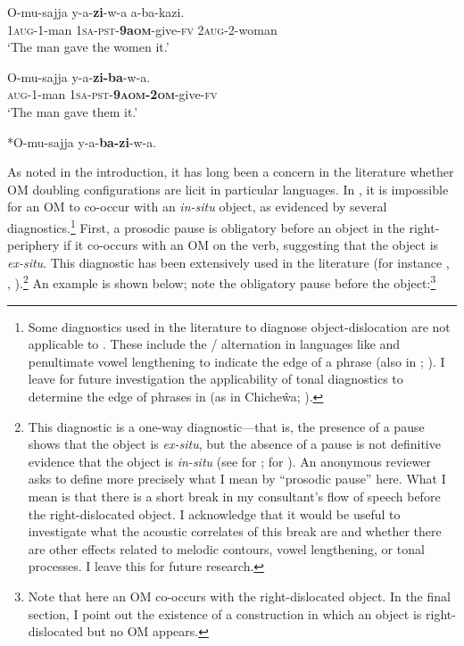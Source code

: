 \documentclass[output=paper,newtxmath,modfonts,nonflat,hidelinks]{langsci/langscibook}
\begin{document}
\ex\label{ex:ranero:9b}
\gll O-mu-sajja    y-a-\textbf{zi}{}-w-a            a-ba-kazi.\\
1\textsc{aug}{}-1-man 1\textsc{sa}{}-\textsc{pst}{}-\textbf{9a\textsc{om}}{}-give-\textsc{fv} 2\textsc{aug}{}-2-woman\\
\glt ‘The man gave the women it.’

\ex\label{ex:ranero:9c}
\gll O-mu-sajja  y-a-\textbf{zi-ba}{}-w-a. \\       
\textsc{aug-}1-man \textsc{1sa-pst}{}-\textbf{\textsc{9aom-2om}}{}-give-\textsc{fv}\\
\glt ‘The man gave them it.’

\ex\label{ex:ranero:9d}*O-mu-sajja y-a-\textbf{ba-zi}{}-w-a.
\z
\z

As noted in the introduction, it has long been a concern in the  literature whether OM doubling configurations are licit in particular languages. In , it is impossible for an OM to co-occur with an \textit{in-situ} object, as evidenced by several diagnostics.\footnote{Some diagnostics used in the  literature to diagnose object-dislocation are not applicable to . These include the / alternation in languages like  \citep{Zeller2015} and penultimate vowel lengthening to indicate the edge of a phrase (also in ; \citealt{ChengDowning2009}). I leave for future investigation the applicability of tonal diagnostics to determine the edge of phrases in  (as in Chiche\^wa; \citealt{Bresnan1987}).} First, a prosodic pause is obligatory before an object in the right-periphery if it co-occurs with an OM on the verb, suggesting that the object is \textit{ex-situ}. This diagnostic has been extensively used in the  literature (for instance \citealt{Cecchetto1999}, \citealt{Cruschina2011}, \citealt{anagnostopouloutoappear}).\footnote{This diagnostic is a one-way diagnostic—that is, the presence of a pause shows that the object is \textit{ex-situ}, but the absence of a pause is not definitive evidence that the object is \textit{in-situ} (see \citealt{dierckstoappear} for ; \citealt{diercks2015} for ). An anonymous reviewer asks to define more precisely what I mean by “prosodic pause” here. What I mean is that there is a short break in my consultant’s flow of speech before the right-dislocated object. I acknowledge that it would be useful to investigate what the acoustic correlates of this break are and whether there are other effects related to melodic contours, vowel lengthening, or tonal processes. I leave this for future research.} An example is shown below; note the obligatory pause before the object:\footnote{Note that here an OM co-occurs with the right-dislocated object. In the final section, I point out the existence of a construction in which an object is right-dislocated but no OM appears.}
\end{document}
